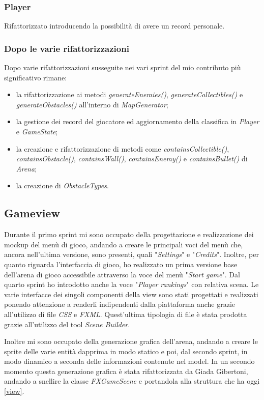 \subsubsection{Player}
Rifattorizzato introducendo la possibilità di avere un record personale.

\subsubsection{Dopo le varie rifattorizzazioni}
Dopo varie rifattorizzazioni susseguite nei vari sprint del mio contributo più significativo rimane:
\begin{itemize}
	\item la rifattorizzazione ai metodi \textit{generateEnemies()}, \textit{generateCollectibles()} e \textit{generateObstacles()} all'interno di \textit{MapGenerator};
	\item la gestione dei record del giocatore ed aggiornamento della classifica in \textit{Player} e \textit{GameState};
	\item la creazione e rifattorizzazione di metodi come \textit{containsCollectible()}, \textit{containsObstacle()}, \textit{containsWall()}, \textit{containsEnemy()} e \textit{containsBullet()} di \textit{Arena};
	\item la creazione di \textit{ObstacleTypes}.
\end{itemize}


\subsection{Gameview}
Durante il primo sprint mi sono occupato della progettazione e realizzazione dei mockup del menù di gioco, andando a creare le principali voci del menù che, ancora nell'ultima versione, sono presenti, quali "\textit{Settings}" e "\textit{Credits}".
Inoltre, per quanto riguarda l'interfaccia di gioco, ho realizzato un prima versione base dell'arena di gioco accessibile attraverso la voce del menù "\textit{Start game}".
Dal quarto sprint ho introdotto anche la voce "\textit{Player rankings}" con relativa scena.
Le varie interfacce dei singoli componenti della view sono stati progettati e realizzati ponendo attenzione a renderli indipendenti dalla piattaforma anche grazie all'utilizzo di file \textit{CSS} e \textit{FXML}.
Quest'ultima tipologia di file è stata prodotta grazie all'utilizzo del tool \textit{Scene Builder}.

Inoltre mi sono occupato della generazione grafica dell'arena, andando a creare le sprite delle varie entità dapprima in modo statico e poi, dal secondo sprint, in modo dinamico a seconda delle informazioni contenute nel model.
In un secondo momento questa generazione grafica è stata rifattorizzata da Giada Gibertoni, andando a snellire la classe \textit{FXGameScene} e portandola alla struttura che ha oggi \ref{view}.

